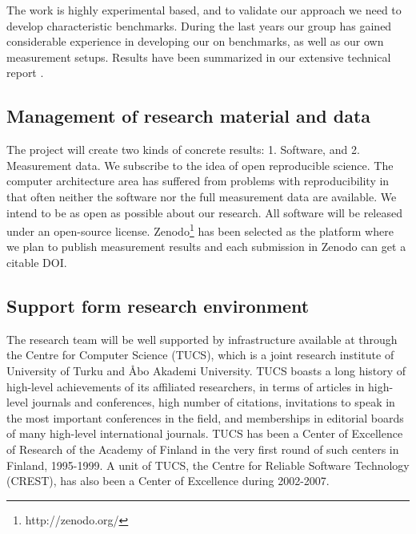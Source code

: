 \documentclass{article}
\begin{document}
The work is highly experimental based, and to validate our approach we need to develop characteristic benchmarks. 
During the last years our group has gained considerable experience in developing our on benchmarks, as well as our own measurement setups. 
Results have been summarized in our extensive technical report \cite{HolmbackaTechrep}. 

\subsection{Management of research material and data}
The project will create two kinds of concrete results: 1. Software, and 2. Measurement data. 
We subscribe to the idea of open reproducible science. 
The computer architecture area has suffered from problems with reproducibility in that often neither the software nor the full measurement data are available. 
We intend to be as open as possible about our research. 
All software will be released under an open-source license. 
Zenodo\footnote{http://zenodo.org/} has been selected as the platform where we plan to publish measurement results and each submission in Zenodo can get a citable DOI.

\subsection{Support form research environment}
The research team will be well supported by infrastructure available at through the Centre for Computer Science (TUCS), 
which is a joint research institute of University of Turku and \AA{}bo Akademi University. 
TUCS boasts a long history of high-level achievements of its affiliated researchers, in terms of articles in high-level journals and conferences, high number of citations, 
invitations to speak in the most important conferences in the field, and memberships in editorial boards of many high-level international journals. 
TUCS has been a Center of Excellence of Research of the Academy of Finland in the very first round of such centers in Finland, 1995-1999. 
A unit of TUCS, the Centre for Reliable Software Technology (CREST), has also been a Center of Excellence during 2002-2007. 
\end{document}
